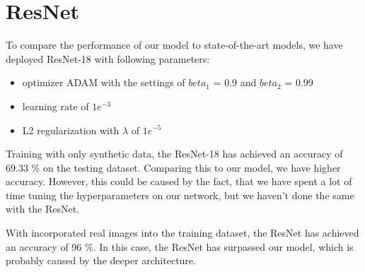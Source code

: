 \section{ResNet}

To compare the performance of our model to state-of-the-art models, we have deployed ResNet-18 with following parameters: 
\begin{itemize}
    \item optimizer ADAM with the settings of $beta_1$ = 0.9 and $beta_2$ = 0.99
    \item learning rate of $1e^{-3}$
    \item L2 regularization with $\lambda$ of $1e^{-5}$
\end{itemize}


Training with only synthetic data, the ResNet-18 has achieved an accuracy of 69.33 \% on the testing dataset. Comparing this to our model, we have higher accuracy. However, this could be caused by the fact, that we have spent a lot of time tuning the hyperparameters on our network, but we haven't done the same with the ResNet. 

With incorporated real images into the training dataset, the ResNet has achieved an accuracy of 96 \%. In this case, the ResNet has surpassed our model, which is probably caused by the deeper architecture.  
